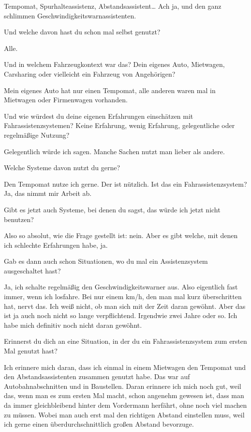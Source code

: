 Tempomat, Spurhalteassistenz, Abstandsassistent… Ach ja, und den ganz
schlimmen Geschwindigkeitswarnassistenten.

\interviewerin
Und welche davon hast du schon mal selbst genutzt?

Alle.

\interviewerin
Und in welchem Fahrzeugkontext war das? Dein eigenes Auto, Mietwagen,
Carsharing oder vielleicht ein Fahrzeug von Angehörigen?

Mein eigenes Auto hat nur einen Tempomat, alle anderen waren mal in
Mietwagen oder Firmenwagen vorhanden.

\interviewerin
Und wie würdest du deine eigenen Erfahrungen einschätzen mit
Fahrassistenzsystemen? Keine Erfahrung, wenig Erfahrung, gelegentliche
oder regelmäßige Nutzung?

Gelegentlich würde ich sagen. Manche Sachen nutzt man lieber als andere.

\interviewerin
Welche Systeme davon nutzt du gerne?

Den Tempomat nutze ich gerne. Der ist nützlich. Ist das ein
Fahrassistenzsystem? Ja, das nimmt mir Arbeit ab.

\interviewerin
Gibt es jetzt auch Systeme, bei denen du sagst, das würde ich jetzt
nicht benutzen?

Also so absolut, wie die Frage gestellt ist: nein. Aber es gibt welche,
mit denen ich schlechte Erfahrungen habe, ja.

\interviewerin
Gab es dann auch schon Situationen, wo du mal ein Assistenzsystem
ausgeschaltet hast?

Ja, ich schalte regelmäßig den Geschwindigkeitswarner aus. Also
eigentlich fast immer, wenn ich losfahre. Bei nur einem km/h, den man
mal kurz überschritten hat, nervt das. Ich weiß nicht, ob man sich mit
der Zeit daran gewöhnt. Aber das ist ja auch noch nicht so lange
verpflichtend. Irgendwie zwei Jahre oder so. Ich habe mich definitiv
noch nicht daran gewöhnt.

\interviewerin
Erinnerst du dich an eine Situation, in der du ein Fahrassistenzsystem
zum ersten Mal genutzt hast?

Ich erinnere mich daran, dass ich einmal in einem Mietwagen den Tempomat
und den Abstandsassistenten zusammen genutzt habe. Das war auf
Autobahnabschnitten und in Baustellen. Daran erinnere ich mich noch gut,
weil das, wenn man es zum ersten Mal macht, schon angenehm gewesen ist,
dass man da immer gleichbleibend hinter dem Vordermann herfährt, ohne
noch viel machen zu müssen. Wobei man auch erst mal den richtigen
Abstand einstellen muss, weil ich gerne einen überdurchschnittlich
großen Abstand bevorzuge.

